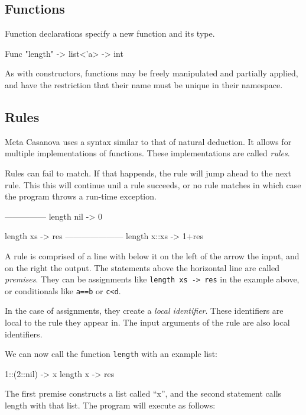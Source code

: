 \subsection{Functions}
Function declarations specify a new function and its type.

\begin{MC}
Func "length" -> list<'a> -> int
\end{MC}

As with constructors, functions may be freely manipulated and partially applied, and have the restriction that their name must be unique in their namespace.

\subsection{Rules}
Meta Casanova uses a syntax similar to that of natural deduction.
It allows for multiple implementations of functions.
These implementations are called \textit{rules}.

Rules can fail to match.
If that happends, the rule will jump ahead to the next rule.
This this will continue unil a rule succeeds, or no rule matches in which case the program throws a run-time exception.

\begin{MC}
---------------
length nil -> 0

length xs -> res
---------------------
length x::xs -> 1+res
\end{MC}

A rule is comprised of a line with below it on the left of the arrow the input, and on the right the output.
The statements above the horizontal line are called \textit{premises}\label{premises}.
They can be assignments like \verb|length xs -> res| in the example above, or conditionals like \verb|a==b| or \verb|c<d|.

In the case of assignments, they create a \textit{local identifier}.
These identifiers are local to the rule they appear in.
The input arguments of the rule are also local identifiers.

We can now call the function \verb|length| with an example list:

\begin{MC}
  1::(2::nil) -> x
  length x    -> res
\end{MC}

The first premise constructs a list called ``x'', and the second statement calls length with that list.
The program will execute as follows:

